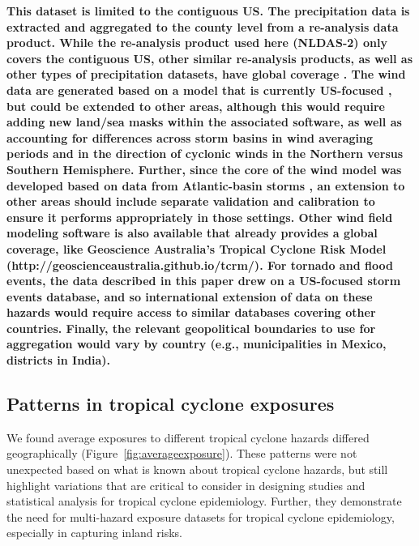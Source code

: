 \textbf{This dataset is limited to the contiguous US. The precipitation data is
extracted and aggregated to the county level from a re-analysis data product.
While the re-analysis product used here (NLDAS-2) only covers the contiguous
US, other similar re-analysis products, as well as other types of precipitation
datasets, have global coverage \parencite{sun2018review}. The wind data are
generated based on a model that is currently US-focused
\parencite{stormwindmodel}, but could be extended to other areas, although this
would require adding new land/sea masks within the associated software, as well
as accounting for differences across storm basins in wind averaging periods
\parencite{harper2010guidelines} and in the direction of cyclonic winds in the
Northern versus Southern Hemisphere. Further, since the core of the wind model
was developed based on data from Atlantic-basin storms
\parencite{willoughby2006parametric}, an extension to other areas should
include separate validation and calibration to ensure it performs appropriately
in those settings. Other wind field modeling software is also available that
already provides a global coverage, like Geoscience Australia's Tropical
Cyclone Risk Model (http://geoscienceaustralia.github.io/tcrm/). For tornado
and flood events, the data described in this paper drew on a US-focused storm
events database, and so international extension of data on these hazards would
require access to similar databases covering other countries. Finally, the
relevant geopolitical boundaries to use for aggregation would vary by country
(e.g., municipalities in Mexico, districts in India).}

\subsection*{Patterns in tropical cyclone exposures}

We found average exposures to different tropical cyclone hazards differed
geographically (Figure~\ref{fig:averageexposure}). These patterns were not
unexpected based on what is known about tropical cyclone hazards, but still
highlight variations that are critical to consider in designing studies and
statistical analysis for tropical cyclone epidemiology. Further, they
demonstrate the need for multi-hazard exposure datasets for tropical cyclone
epidemiology, especially in capturing inland risks. 

